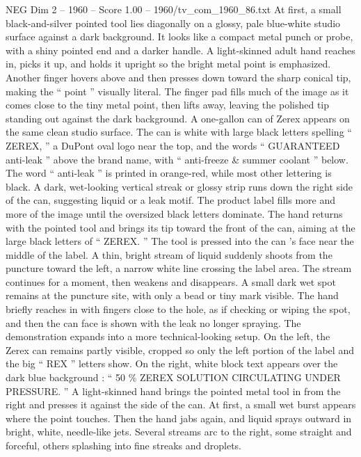 \begin{textsample}{NEG Dim 2 – 1960 – Score 1.00 – 1960/tv\_com\_1960\_86.txt}  \label{ex:f2_neg_085}
At first, a small black-and-silver pointed tool lies diagonally on a glossy, pale blue-white studio surface against a dark background.
It looks like a compact metal punch or probe, with a shiny pointed end and a darker handle.
A light-skinned adult hand reaches in, picks it up, and holds it upright so the bright metal point is emphasized.
Another finger hovers above and then presses down toward the sharp conical tip, making the “ point ” visually literal.
The finger pad fills much of the image as it comes close to the tiny metal point, then lifts away, leaving the polished tip standing out against the dark background.
A one-gallon can of Zerex appears on the same clean studio surface.
The can is white with large black letters spelling “ ZEREX, ” a DuPont oval logo near the top, and the words “ GUARANTEED anti-leak ” above the brand name, with “ anti-freeze \& summer coolant ” below.
The word “ anti-leak ” is printed in orange-red, while most other lettering is black.
A dark, wet-looking vertical streak or glossy strip runs down the right side of the can, suggesting liquid or a leak motif.
The product label fills more and more of the image until the oversized black letters dominate.
The hand returns with the pointed tool and brings its tip toward the front of the can, aiming at the large black letters of “ ZEREX. ” The tool is pressed into the can ’s face near the middle of the label.
A thin, bright stream of liquid suddenly shoots from the puncture toward the left, a narrow white line crossing the label area.
The stream continues for a moment, then weakens and disappears.
A small dark wet spot remains at the puncture site, with only a bead or tiny mark visible.
The hand briefly reaches in with fingers close to the hole, as if checking or wiping the spot, and then the can face is shown with the leak no longer spraying.
The demonstration expands into a more technical-looking setup.
On the left, the Zerex can remains partly visible, cropped so only the left portion of the label and the big “ REX ” letters show.
On the right, white block text appears over the dark blue background : “ 50 \% ZEREX SOLUTION CIRCULATING UNDER PRESSURE. ” A light-skinned hand brings the pointed metal tool in from the right and presses it against the side of the can.
At first, a small wet burst appears where the point touches.
Then the hand jabs again, and liquid sprays outward in bright, white, needle-like jets.
Several streams arc to the right, some straight and forceful, others splashing into fine streaks and droplets.

\end{textsample}
